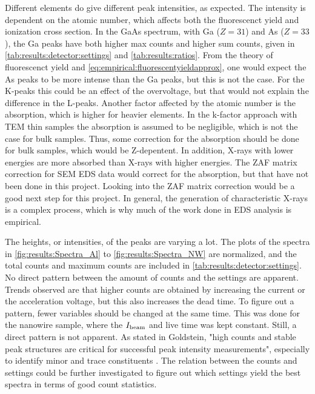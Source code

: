 Different elements do give different peak intensities, as expected.
The intensity is dependent on the atomic number, which affects both the fluorescenct yield and ionization cross section.
In the GaAs spectrum, with Ga ($Z=31$) and As ($Z=33$), the Ga peaks have both higher max counts and higher sum counts, given in \cref{tab:results:detector:settings} and \cref{tab:results:ratios}.
From the theory of fluorescenct yield and \cref{eq:empirical:fluorescentyieldapprox}, one would expect the As peaks to be more intense than the Ga peaks, but this is not the case.
For the K-peaks this could be an effect of the overvoltage, but that would not explain the difference in the L-peaks.
Another factor affected by the atomic number is the absorption, which is higher for heavier elements.
In the k-factor approach with TEM thin samples the absorption is assumed to be negligible, which is not the case for bulk samples.
Thus, some correction for the absorption should be done for bulk samples, which would be Z-depentent.
In addition, X-rays with lower energies are more absorbed than X-rays with higher energies.
The ZAF matrix correction for SEM EDS data would correct for the absorption, but that have not been done in this project.
Looking into the ZAF matrix correction would be a good next step for this project.
In general, the generation of characteristic X-rays is a complex process, which is why much of the work done in EDS analysis is empirical.


The heights, or intensities, of the peaks are varying a lot.
The plots of the spectra in \cref{fig:results:Spectra_Al} to \cref{fig:results:Spectra_NW} are normalized, and the total counts and maximum counts are included in \cref{tab:results:detector:settings}.
No direct pattern between the amount of counts and the settings are apparent.
Trends observed are that higher counts are obtained by increasing the current or the acceleration voltage, but this also increases the dead time.
To figure out a pattern, fewer variables should be changed at the same time.
This was done for the nanowire sample, where the $I_\textnormal{beam}$ and live time was kept constant.
Still, a direct pattern is not apparent.
As stated in Goldstein, "high counts and stable peak structures are critical for successful peak intensity measurements", especially to identify minor and trace constituents \cite[page 318]{goldstein_scanning_2018}.
The relation between the counts and settings could be further investigated to figure out which settings yield the best spectra in terms of good count statistics.

